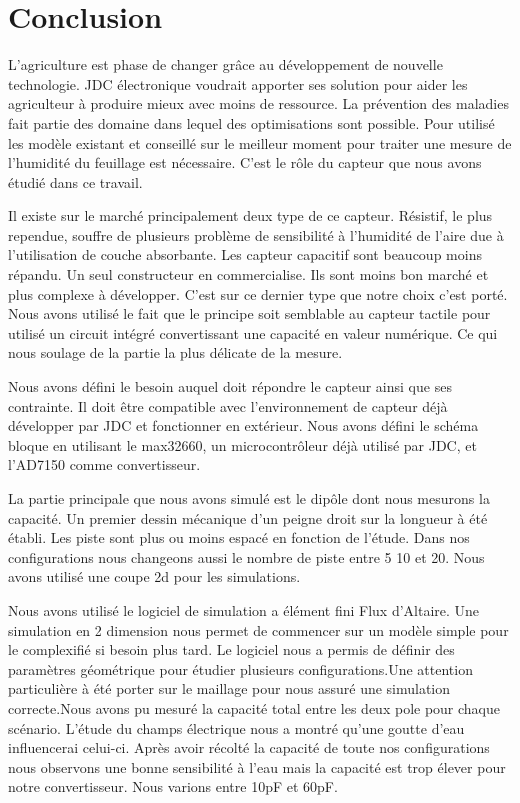 \section{Conclusion}

L'agriculture est phase de changer grâce au développement de nouvelle technologie. JDC électronique voudrait apporter ses solution pour aider les agriculteur à produire mieux avec moins de ressource. La prévention des maladies fait partie des domaine dans lequel des optimisations sont possible. Pour utilisé les modèle existant et conseillé sur le meilleur moment pour traiter une mesure de l'humidité du feuillage est nécessaire. C'est le rôle du capteur que nous avons étudié dans ce travail.

Il existe sur le marché principalement deux type de ce capteur. Résistif, le plus rependue, souffre de plusieurs problème de sensibilité à l'humidité de l'aire due à l'utilisation de couche absorbante. Les capteur capacitif sont beaucoup moins répandu. Un seul constructeur en commercialise. Ils sont moins bon marché et plus complexe à développer. C'est sur ce dernier type que notre choix c'est porté. Nous avons  utilisé le fait que le principe soit semblable au capteur tactile pour utilisé un circuit intégré convertissant une capacité en valeur numérique. Ce qui nous soulage de la partie la plus délicate de la mesure.

Nous avons défini le besoin auquel doit répondre le capteur ainsi que ses contrainte. Il doit être compatible avec l’environnement de capteur déjà développer par JDC et fonctionner en extérieur. Nous avons défini le schéma bloque en utilisant le max32660, un microcontrôleur déjà utilisé par JDC, et l'AD7150 comme convertisseur.

La partie principale que nous avons simulé est le dipôle dont nous mesurons la capacité. Un premier dessin mécanique d'un peigne droit sur la longueur à été établi. Les piste sont plus ou moins espacé en fonction de l'étude. Dans nos configurations nous changeons aussi le nombre de piste entre 5 10 et 20. Nous avons utilisé une coupe 2d pour les simulations.

Nous avons utilisé le logiciel de simulation a élément fini Flux d'Altaire. Une simulation en 2 dimension nous permet de commencer sur un modèle simple pour le complexifié si besoin plus tard. Le logiciel nous a permis de définir des paramètres géométrique pour étudier plusieurs configurations.Une attention particulière à été porter sur le maillage pour nous assuré une simulation correcte.Nous avons pu mesuré la capacité total entre les deux pole pour chaque scénario. L'étude du champs électrique nous a montré qu'une goutte d'eau influencerai celui-ci. Après avoir récolté la capacité de toute nos configurations nous observons une bonne sensibilité à l'eau mais la capacité est trop élever pour notre convertisseur. Nous varions entre 10pF et 60pF.

